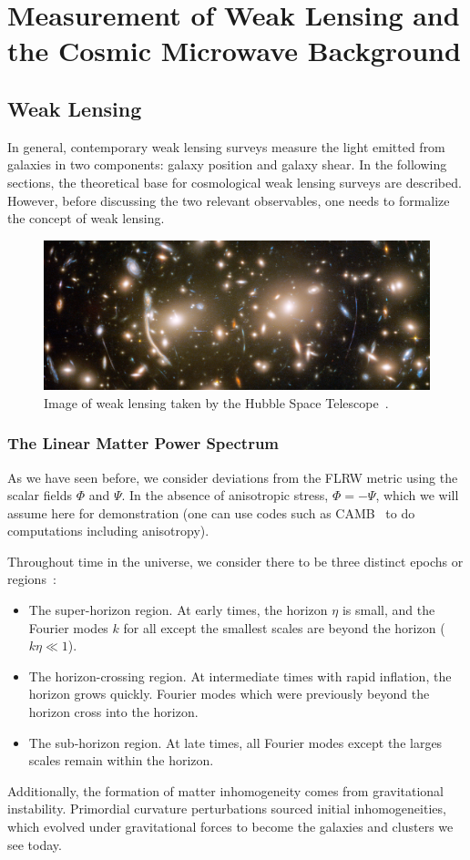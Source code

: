 \chapter{Measurement of Weak Lensing and the Cosmic Microwave Background}
\section{Weak Lensing}
In general, contemporary weak lensing surveys measure the light emitted from galaxies in two components: galaxy position and galaxy shear. In the following sections, the theoretical base for cosmological weak lensing surveys are described. However, before discussing the two relevant observables, one needs to formalize the concept of weak lensing.
\begin{figure}[ht]
	\centering
	\includegraphics[width=\textwidth]{plots/hubble_weak_lensing.png}
	\caption{Image of weak lensing taken by the Hubble Space Telescope~\cite{hubble_lensing}.}
	\label{fig:weak_lensing}
\end{figure}
\subsection{The Linear Matter Power Spectrum}
As we have seen before, we consider deviations from the FLRW metric using the scalar fields $\Phi$ and $\Psi$. In the absence of anisotropic stress, $\Phi=-\Psi$, which we will assume here for demonstration (one can use codes such as CAMB~\cite{antony_lewis_camb_nodate} to do computations including anisotropy). 

Throughout time in the universe, we consider there to be three distinct epochs or regions~\cite{scott_dodelson_modern_2021}:
\begin{itemize}
	\item The super-horizon region. At early times, the horizon $\eta$ is small, and the Fourier modes $k$ for all except the smallest scales are beyond the horizon ($k\eta\ll1$).
	\item The horizon-crossing region. At intermediate times with rapid inflation, the horizon grows quickly. Fourier modes which were previously beyond the horizon cross into the horizon.
	\item The sub-horizon region. At late times, all Fourier modes except the larges scales remain within the horizon.
\end{itemize}
Additionally, the formation of matter inhomogeneity comes from gravitational instability. Primordial curvature perturbations sourced initial inhomogeneities, which evolved under gravitational forces to become the galaxies and clusters we see today.

